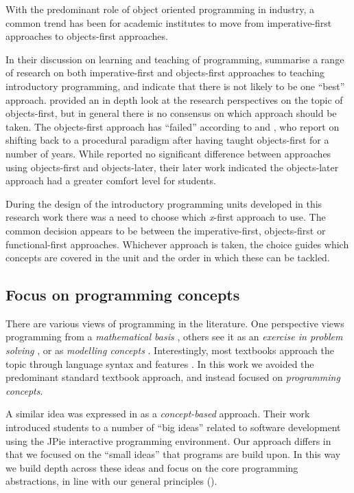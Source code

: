 With the predominant role of object oriented programming in industry, a common trend has been for academic institutes to move from imperative-first approaches to objects-first approaches. 

In their discussion on learning and teaching of programming, \citet{Robins:2003} summarise a range of research on both imperative-first and objects-first approaches to teaching introductory programming, and indicate that there is not likely to be one ``best'' approach. \citet{Lister:2006a} provided an in depth look at the research perspectives on the topic of objects-first, but in general there is no consensus on which approach should be taken. The objects-first approach has ``failed'' according to \citet{Astrachan:2005} and \citet{Reges:2006}, who report on shifting back to a procedural paradigm after having taught objects-first for a number of years. While \citet{Ehlert:2009} reported no significant difference between approaches using objects-first and objects-later, their later work \cite{Ehlert:2010} indicated the objects-later approach had a greater comfort level for students. 

During the design of the introductory programming units developed in this research work there was a need to choose which \emph{x}-first approach to use. The common decision appears to be between the imperative-first, objects-first or functional-first approaches. Whichever approach is taken, the choice guides which concepts are covered in the unit and the order in which these can be tackled.


\subsection{Focus on programming concepts} %
\label{sub:focus_on_programming_concepts}

There are various views of programming in the literature. One perspective views programming from a \emph{mathematical basis} \cite{Denning:1989,Dijkstra:1989,Hoare:1969}, others see it as an \emph{exercise in problem solving} \cite{Palumbo:1990}, or as \emph{modelling concepts} \cite{Bennedsen:2004}. Interestingly, most textbooks approach the topic through language syntax and features \cite{Robins:2003}. In this work we avoided the predominant standard textbook approach, and instead focused on \emph{programming concepts}.

A similar idea was expressed in \citet{Goldman:2004} as a \emph{concept-based} approach. Their work introduced students to a number of ``big ideas'' related to software development using the JPie interactive programming environment. Our approach differs in that we focused on the ``small ideas'' that programs are build upon. In this way we build depth across these ideas and focus on the core programming abstractions, in line with our general principles ().

